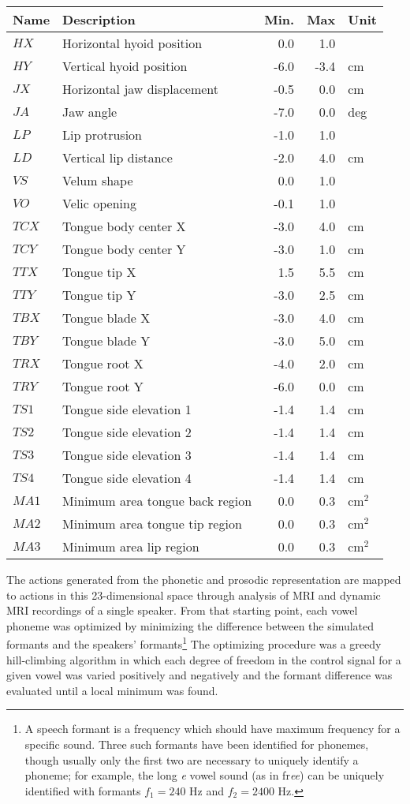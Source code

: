 \documentclass{article}
\begin{document}
\begin{tabular}{llrrl}
\toprule
{\bf Name} & {\bf Description} & {\bf Min.} & {\bf Max} & {\bf Unit} \\
\midrule
$HX$ & Horizontal hyoid position & 0.0 & 1.0 & \\
$HY$ & Vertical hyoid position & -6.0 & -3.4 & cm \\
$JX$ & Horizontal jaw displacement & -0.5 & 0.0 & cm \\
$JA$ & Jaw angle & -7.0 & 0.0 & deg \\
$LP$ & Lip protrusion & -1.0 & 1.0 & \\
$LD$ & Vertical lip distance & -2.0 & 4.0 & cm \\
$VS$ & Velum shape & 0.0 & 1.0 & \\
$VO$ & Velic opening & -0.1 & 1.0 & \\
$TCX$ & Tongue body center X & -3.0 & 4.0 & cm \\
$TCY$ & Tongue body center Y & -3.0 & 1.0 & cm \\
$TTX$ & Tongue tip X & 1.5 & 5.5 & cm \\
$TTY$ & Tongue tip Y & -3.0 & 2.5 & cm \\
$TBX$ & Tongue blade X & -3.0 & 4.0 & cm \\
$TBY$ & Tongue blade Y & -3.0 & 5.0 & cm \\
$TRX$ & Tongue root X & -4.0 & 2.0 & cm \\
$TRY$ & Tongue root Y & -6.0 & 0.0 & cm \\
$TS1$ & Tongue side elevation 1 & -1.4 & 1.4 & cm \\
$TS2$ & Tongue side elevation 2 & -1.4 & 1.4 & cm \\
$TS3$ & Tongue side elevation 3 & -1.4 & 1.4 & cm \\
$TS4$ & Tongue side elevation 4 & -1.4 & 1.4 & cm \\
$MA1$ & Minimum area tongue back region & 0.0 & 0.3 & cm$^2$ \\
$MA2$ & Minimum area tongue tip region & 0.0 & 0.3 & cm$^2$ \\
$MA3$ & Minimum area lip region & 0.0 & 0.3 & cm$^2$ \\
\bottomrule
\end{tabular}

The actions generated from
the phonetic and prosodic representation
are mapped to actions in this 23-dimensional space
through analysis of MRI and dynamic MRI recordings
of a single speaker.
From that starting point,
each vowel phoneme was optimized
by minimizing the difference
between the simulated formants
and the speakers' formants\footnote{A
speech formant is a frequency which should
have maximum frequency for a specific
sound. Three such formants have been identified
for phonemes, though usually only the first
two are necessary to uniquely identify
a phoneme; for example, the long \textit{e}
vowel sound (as in fr\textit{ee})
can be uniquely identified with
formants $f_1=240$ Hz and $f_2=2400$ Hz.}
The optimizing procedure
was a greedy hill-climbing algorithm
in which each degree of freedom in
the control signal for a given vowel
was varied positively and negatively
and the formant difference was evaluated
until a local minimum was found.
\end{document}
